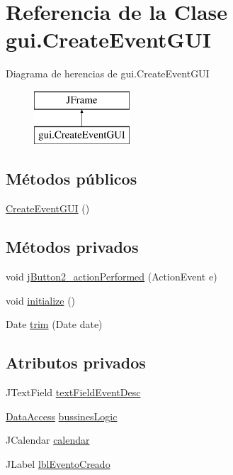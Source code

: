 \hypertarget{classgui_1_1CreateEventGUI}{}\section{Referencia de la Clase gui.\+Create\+Event\+G\+UI}
\label{classgui_1_1CreateEventGUI}
Diagrama de herencias de gui.\+Create\+Event\+G\+UI\begin{figure}[H]
\begin{center}
\leavevmode
\includegraphics[height=2.000000cm]{classgui_1_1CreateEventGUI}
\end{center}
\end{figure}
\subsection*{Métodos públicos}
\begin{DoxyCompactItemize}
\item 
\mbox{\hyperlink{classgui_1_1CreateEventGUI_afd301ba60a1dd47e03527110c3017274}{Create\+Event\+G\+UI}} ()
\end{DoxyCompactItemize}
\subsection*{Métodos privados}
\begin{DoxyCompactItemize}
\item 
void \mbox{\hyperlink{classgui_1_1CreateEventGUI_aa70a7c4a8c690ea080c4f1bc041e9a09}{j\+Button2\+\_\+action\+Performed}} (Action\+Event e)
\item 
void \mbox{\hyperlink{classgui_1_1CreateEventGUI_acc6eefcb43c6834a78767aac5f721ffd}{initialize}} ()
\item 
Date \mbox{\hyperlink{classgui_1_1CreateEventGUI_a2a70eddae15216e91c11a7c909e3217a}{trim}} (Date date)
\end{DoxyCompactItemize}
\subsection*{Atributos privados}
\begin{DoxyCompactItemize}
\item 
J\+Text\+Field \mbox{\hyperlink{classgui_1_1CreateEventGUI_a7500da1a45bd490e612ff33bfb91592b}{text\+Field\+Event\+Desc}}
\item 
\mbox{\hyperlink{classdataAccess_1_1DataAccess}{Data\+Access}} \mbox{\hyperlink{classgui_1_1CreateEventGUI_ac17ddd8a0373665374aa7f174b3ccd48}{bussines\+Logic}}
\item 
J\+Calendar \mbox{\hyperlink{classgui_1_1CreateEventGUI_a27bb4d6170bc03fe771e186664b860aa}{calendar}}
\item 
J\+Label \mbox{\hyperlink{classgui_1_1CreateEventGUI_a45ab76afdfd93dac6437dc24b99abf34}{lbl\+Evento\+Creado}}
\end{DoxyCompactItemize}


